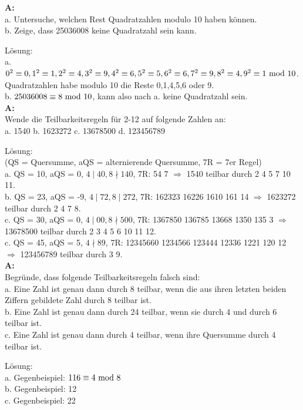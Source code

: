 \documentclass[landscape,twocolumn,a4paper]{article}
\begin{document}
\textbf{A:}   \\
a. Untersuche, welchen Rest Quadratzahlen modulo 10 haben können. \\
b. Zeige, dass 25036008 keine Quadratzahl sein kann.
\bigskip {}

Lösung: \\
a. $0^2 \equiv 0, 1^2 \equiv 1, 2^2 \equiv 4, 3^2 \equiv 9, 4^2 \equiv 6, 5^2 \equiv 5, 6^2 \equiv 6, 7^2 \equiv 9,
8^2 \equiv 4, 9^2 \equiv 1 \text{ mod } 10$. Quadratzahlen habe modulo 10 die Reste 0,1,4,5,6 oder 9. \\
b. $25036008 \equiv 8 \text{ mod } 10$, kann also nach a. keine Quadratzahl sein. \\

\textbf{A:}   \\
Wende die Teilbarkeitsregeln für 2-12 auf folgende Zahlen an:\\
a. 1540 \quad b. 1623272 \quad c. 13678500 \quad d. 123456789
\bigskip {}

Lösung: \\
(QS = Quersumme, aQS = alternierende Quersumme, 7R = 7er Regel) \\
a. QS = 10, aQS = 0, $4 \mid 40, 8 \nmid 140$, 7R: 54 7 $\Rightarrow$
1540 teilbar durch 2 4 5 7 10 11.\\
b. QS = 23, aQS = -9, $4 \mid 72, 8 \mid 272$, 7R: 162323 16226 1610 161 14 $\Rightarrow$
1623272 teilbar durch 2 4 7 8. \\
c. QS = 30, aQS = 0, $4 \mid 00, 8 \nmid 500$, 7R: 1367850 136785 13668 1350 135 3 $\Rightarrow$
13678500 teilbar durch 2 3 4 5 6 10 11 12.\\
c. QS = 45, aQS = 5, $4 \nmid 89$, 7R: 12345660 1234566 123444 12336 1221 120 12 $\Rightarrow$
123456789 teilbar durch 3 9. \\

\textbf{A:}   \\
Begründe, dass folgende Teilbarkeitsregeln falsch sind: \\
a. Eine Zahl ist genau dann durch 8 teilbar, wenn die aus ihren letzten beiden Ziffern gebildete Zahl durch 8 teilbar ist. \\
b. Eine Zahl ist genau dann durch 24 teilbar, wenn sie durch 4 und durch 6 teilbar ist. \\
c. Eine Zahl ist genau dann durch 4 teilbar, wenn ihre Quersumme durch 4 teilbar ist.
\bigskip {}

Lösung: \\
a. Gegenbeispiel: $116 \equiv 4 \text{ mod } 8$ \\
b. Gegenbeispiel: 12 \\
c. Gegenbeispiel: 22 \\
\end{document}
